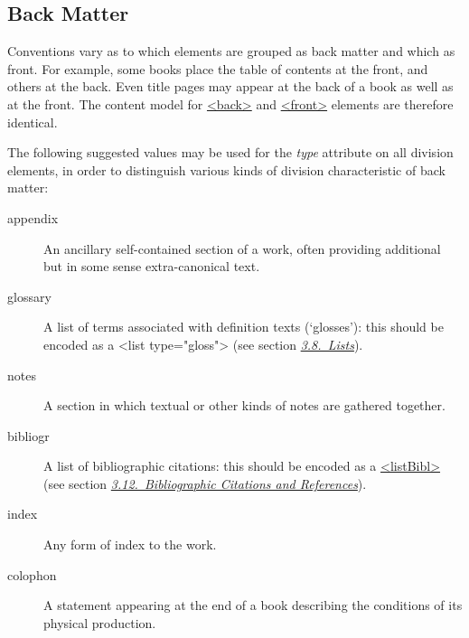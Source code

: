 \subsection[{Back Matter}]{Back Matter}\label{DSBACK}\par
Conventions vary as to which elements are grouped as back matter and which as front. For example, some books place the table of contents at the front, and others at the back. Even title pages may appear at the back of a book as well as at the front. The content model for \hyperref[TEI.back]{<back>} and \hyperref[TEI.front]{<front>} elements are therefore identical.\par
The following suggested values may be used for the {\itshape type} attribute on all division elements, in order to distinguish various kinds of division characteristic of back matter: \begin{description}

\item[{appendix}]An ancillary self-contained section of a work, often providing additional but in some sense extra-canonical text.
\item[{glossary}]A list of terms associated with definition texts (‘glosses’): this should be encoded as a <list type="gloss"> (see section \textit{\hyperref[COLI]{3.8.\ Lists}}).
\item[{notes}]A section in which textual or other kinds of notes are gathered together.
\item[{bibliogr}]A list of bibliographic citations: this should be encoded as a \hyperref[TEI.listBibl]{<listBibl>} (see section \textit{\hyperref[COBI]{3.12.\ Bibliographic Citations and References}}).
\item[{index}]Any form of index to the work.
\item[{colophon}]A statement appearing at the end of a book describing the conditions of its physical production.
\end{description} \par
